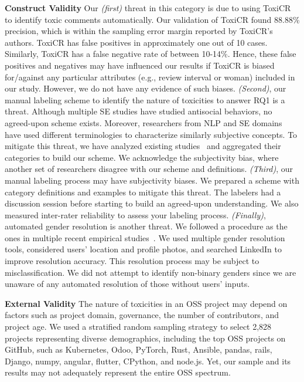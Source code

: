 \vspace{2pt} \noindent \textbf{Construct Validity}
Our \textit{(first)} threat in this category is due to using ToxiCR~\cite{sarker2022automated} to identify toxic comments automatically. 
Our validation of ToxiCR found 88.88\% precision, which is within the sampling error margin reported by ToxiCR's authors. ToxiCR has false positives in approximately one out of 10 cases. Similarly, ToxiCR has a false negative rate of between 10-14\%. Hence, these false positives and negatives may have influenced our results if ToxiCR is biased for/against any particular attributes (e.g., review interval or woman) included in our study. However, we do not have any evidence of such biases.
\textit{(Second)}, our manual labeling scheme to identify the nature of toxicities to answer RQ1 is a threat. Although multiple SE studies have studied antisocial behaviors, no agreed-upon scheme exists. Moreover, researchers from NLP and SE domains have used different terminologies to characterize similarly subjective concepts.
To mitigate this threat, we have analyzed existing studies~\cite{sarker2022automated,miller2022did, ferreira2021shut,egelman2020predicting,ferreira2022heated} and aggregated their categories to build our scheme. We acknowledge the subjectivity bias, where another set of researchers disagree with our scheme and definitions. \textit{(Third)}, our manual labeling process may have subjectivity biases. We prepared a scheme with category definitions and examples to mitigate this threat. The labelers had a discussion session before starting to build an agreed-upon understanding. We also measured inter-rater reliability to assess your labeling process. 
\textit{(Finally)}, automated gender resolution is another threat. We followed a procedure as the ones in multiple recent empirical studies~\cite{sultana2022code,santamaria2018comparison,bosu2019diversity}. We used multiple gender resolution tools, considered users' location and profile photos, and searched LinkedIn to improve resolution accuracy. This resolution process may be subject to misclassification. We did not attempt to identify
non-binary genders since we are unaware of any automated resolution of those without users' inputs.


\vspace{2pt} \noindent \textbf{External Validity}
The nature of toxicities in an OSS project may depend on factors such as project domain, governance, the number of contributors, and project age. 
We used a stratified random sampling strategy to select 2,828 projects representing diverse demographics, including the top OSS projects on GitHub, such as Kubernetes, Odoo, PyTorch, Rust, Ansible, pandas, rails, Django, numpy, angular, flutter, CPython, and node.js. 
Yet, our sample and its results may not adequately represent the entire OSS spectrum.
 


